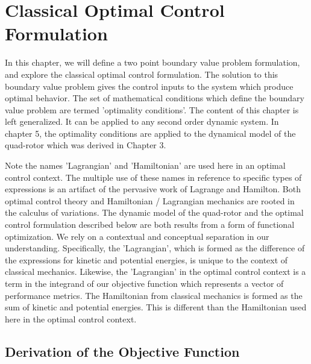 
\chapter{Classical Optimal Control Formulation} %

\label{Chapter4} %


In this chapter, we will define a two point boundary value problem formulation, and explore the classical optimal control formulation. The solution to this boundary value problem gives the control inputs to the system which produce optimal behavior. The set of mathematical conditions which define the boundary value problem are termed 'optimality conditions'. The content of this chapter is left generalized. It can be applied to any second order dynamic system. In chapter 5, the optimality conditions are applied to the dynamical model of the quad-rotor which was derived in Chapter 3.

Note the names 'Lagrangian' and 'Hamiltonian' are used here in an optimal control context. The multiple use of these names in reference to specific types of expressions is an artifact of the pervasive work of Lagrange and Hamilton. Both optimal control theory and Hamiltonian / Lagrangian mechanics are rooted in the calculus of variations. The dynamic model of the quad-rotor and the optimal control formulation described below are both results from a form of functional optimization. We rely on a contextual and conceptual separation in our understanding. Specifically, the 'Lagrangian', which is formed as the difference of the expressions for kinetic and potential energies, is unique to the context of classical mechanics. Likewise, the 'Lagrangian' in the optimal control context is a term in the integrand of our objective function which represents a vector of performance metrics. The Hamiltonian from classical mechanics is formed as the sum of kinetic and potential energies. This is different than the Hamiltonian used here in the optimal control context.
 


\section{Derivation of the Objective Function}

